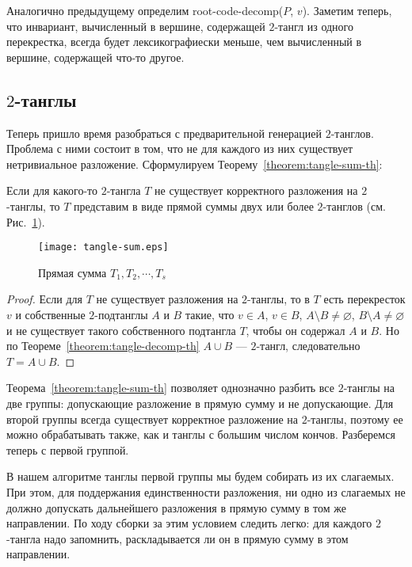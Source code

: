 		Аналогично предыдущему определим root-code-decomp($P$, $v$). Заметим теперь, что инвариант, вычисленный в вершине, содержащей
		$2$-тангл из одного перекрестка, всегда будет лексикографиески меньше, чем вычисленный в вершине, содержащей что-то другое.

	\subsection{$2$-танглы}

		Теперь пришло время разобраться с предварительной генерацией $2$-танглов. Проблема с ними состоит в том, что не для каждого
		из них существует нетривиальное разложение. Сформулируем Теорему~\ref{theorem:tangle-sum-th}:

		\begin{theorem}
			\label{theorem:tangle-sum-th}
			Если для какого-то $2$-тангла $T$ не существует корректного разложения на $2$-танглы, то $T$ представим в виде прямой
			суммы двух или более $2$-танглов (см. Рис.~\ref{figure:tangle-sum}).

			\begin{figure}[H]
				\centering
				\texttt{[image: tangle-sum.eps]}
				\caption{Прямая сумма $T_1, T_2,\cdots, T_s$\label{figure:tangle-sum}}
			\end{figure}
		\end{theorem}
		\begin{proof}
			Если для $T$ не существует разложения на $2$-танглы, то в $T$ есть перекресток $v$ и собственные $2$-подтанглы $A$ и $B$
			такие, что $v \in A$, $v \in B$, $A\setminus B\neq\varnothing$, $B\setminus A\neq\varnothing$ и не существует такого
			собственного подтангла $T$, чтобы он содержал $A$ и $B$. Но по Теореме~\ref{theorem:tangle-decomp-th} $A \cup B$ ---
			$2$-тангл, следовательно $T = A \cup B$.
		\end{proof}
		
		Теорема~\ref{theorem:tangle-sum-th} позволяет однозначно разбить все $2$-танглы на две группы: допускающие разложение в прямую
		сумму и не допускающие. Для второй группы всегда существует корректное разложение на $2$-танглы, поэтому ее можно обрабатывать
		также, как и танглы с большим числом кончов. Разберемся теперь с первой группой.

		В нашем алгоритме танглы первой группы мы будем собирать из их слагаемых. При этом, для поддержания единственности разложения, ни
		одно из слагаемых не должно допускать дальнейшего разложения в прямую сумму в том же направлении. По ходу сборки за этим условием
		следить легко: для каждого $2$-тангла надо запомнить, раскладывается ли он в прямую сумму в этом направлении.

